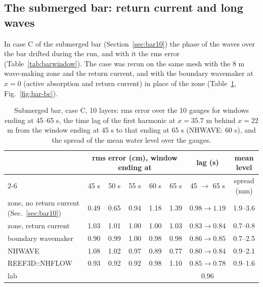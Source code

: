 \subsection{The submerged bar: return current and long waves}
\label{sec:bar-bc}

In case C of the submerged bar (Section~\ref{sec:bar10}) the phase of the
waves over the bar drifted during the run, and with it the rms error
(Table~\ref{tab:barwindow}). The case was rerun on the same mesh with the
8 m wave-making zone and the return current, and with the boundary
wavemaker at $x = 0$ (active absorption and return current) in place of
the zone (Table~\ref{tab:bar-bc}, Fig.~\ref{fig:bar-bc}).

\begin{table}[!htbp]
\centering
\caption{Submerged bar, case C, 10 layers: rms error over the 10 gauges for
windows ending at 45--65 s, the time lag of the first harmonic at
$x = 35.7$ m behind $x = 22$ m from the window ending at 45 s to that
ending at 65 s (NHWAVE: 60 s), and the spread of the mean water level over
the gauges.}
\label{tab:bar-bc}
\small
\setlength{\tabcolsep}{3.5pt}
\begin{tabular}{lccccccc}
\toprule
 & \multicolumn{5}{c}{rms error (cm), window ending at} & lag (s) & mean level \\
\cmidrule(lr){2-6}
 & 45 s & 50 s & 55 s & 60 s & 65 s & 45 $\to$ 65 s & spread (mm) \\
\midrule
zone, no return current (Sec.~\ref{sec:bar10}) & 0.49 & 0.65 & 0.94 & 1.18 & 1.39 & $0.98 \to 1.19$ & 1.9--3.6 \\
zone, return current & 1.03 & 1.01 & 1.00 & 1.00 & 1.03 & $0.83 \to 0.84$ & 0.7--0.8 \\
boundary wavemaker & 0.90 & 0.99 & 1.00 & 0.98 & 0.98 & $0.86 \to 0.85$ & 0.7--2.5 \\
NHWAVE & 1.08 & 1.02 & 0.97 & 0.89 & 0.77 & $0.80 \to 0.84$ & 0.9--2.1 \\
REEF3D::NHFLOW & 0.93 & 0.92 & 0.92 & 0.98 & 1.10 & $0.85 \to 0.78$ & 0.9--1.6 \\
lab & & & & & & 0.96 & \\
\bottomrule
\end{tabular}
\end{table}

